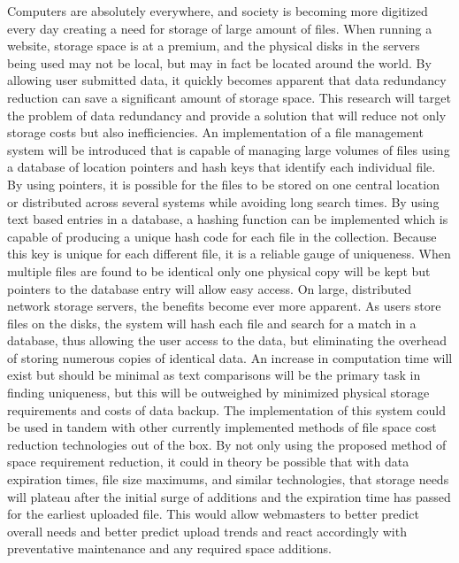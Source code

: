 \documentclass[11pt]{article}
\begin{document}
Computers are absolutely everywhere, and society is becoming more digitized every day creating
a need for storage of large amount of files. When running a website, storage space is at a
premium, and the physical disks in the servers being used may not be local, but may in fact be
located around the world. By allowing user submitted data, it quickly becomes apparent that data
redundancy reduction can save a significant amount of storage space. This research will target
the problem of data redundancy and provide a solution that will reduce not only storage costs but
also inefficiencies. An implementation of a file management system will be introduced that is
capable of managing large volumes of files using a database of location pointers and hash keys
that identify each individual file. By using pointers, it is possible for the files to be stored on one
central location or distributed across several systems while avoiding long search times.
By using text based entries in a database, a hashing function can be implemented which is capable
of producing a unique hash code for each file in the collection. Because this key is unique for each
different file, it is a reliable gauge of uniqueness. When multiple files are found to be identical
only one physical copy will be kept but pointers to the database entry will allow easy access.
On large, distributed network storage servers, the benefits become ever more apparent. As users
store files on the disks, the system will hash each file and search for a match in a database,
thus allowing the user access to the data, but eliminating the overhead of storing numerous
copies of identical data. An increase in computation time will exist but should be minimal as
text comparisons will be the primary task in finding uniqueness, but this will be outweighed by
minimized physical storage requirements and costs of data backup.
The implementation of this system could be used in tandem with other currently implemented
methods of file space cost reduction technologies out of the box. By not only using the proposed
method of space requirement reduction, it could in theory be possible that with data expiration times, file size maximums, and similar technologies, that storage needs will plateau after the
initial surge of additions and the expiration time has passed for the earliest uploaded file. This
would allow webmasters to better predict overall needs and better predict upload trends and react
accordingly with preventative maintenance and any required space additions.

\vspace*{-.1in}
\end{document}
